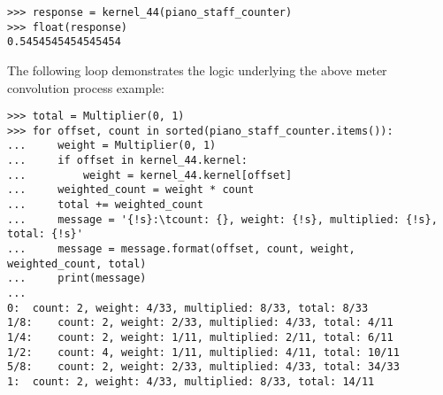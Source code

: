 \begin{abjadbookoutput}
\begin{singlespacing}
\vspace{-0.5\baselineskip}
\begin{verbatim}
>>> response = kernel_44(piano_staff_counter)
>>> float(response)
0.5454545454545454
\end{verbatim}
\end{singlespacing}
\end{abjadbookoutput}

\noindent The following loop demonstrates the logic underlying the above meter
convolution process example:

\begin{comment}
<abjad>
total = Multiplier(0, 1)
for offset, count in sorted(piano_staff_counter.items()):
    weight = Multiplier(0, 1)
    if offset in kernel_44.kernel:
        weight = kernel_44.kernel[offset]
    weighted_count = weight * count
    total += weighted_count
    message = '{!s}:\tcount: {}, weight: {!s}, multiplied: {!s}, total: {!s}'
    message = message.format(offset, count, weight, weighted_count, total)
    print(message)

</abjad>
\end{comment}

\begin{abjadbookoutput}
\begin{singlespacing}
\vspace{-0.5\baselineskip}
\begin{verbatim}
>>> total = Multiplier(0, 1)
>>> for offset, count in sorted(piano_staff_counter.items()):
...     weight = Multiplier(0, 1)
...     if offset in kernel_44.kernel:
...         weight = kernel_44.kernel[offset]
...     weighted_count = weight * count
...     total += weighted_count
...     message = '{!s}:\tcount: {}, weight: {!s}, multiplied: {!s}, total: {!s}'
...     message = message.format(offset, count, weight, weighted_count, total)
...     print(message)
...
0:	count: 2, weight: 4/33, multiplied: 8/33, total: 8/33
1/8:	count: 2, weight: 2/33, multiplied: 4/33, total: 4/11
1/4:	count: 2, weight: 1/11, multiplied: 2/11, total: 6/11
1/2:	count: 4, weight: 1/11, multiplied: 4/11, total: 10/11
5/8:	count: 2, weight: 2/33, multiplied: 4/33, total: 34/33
1:	count: 2, weight: 4/33, multiplied: 8/33, total: 14/11
\end{verbatim}
\end{singlespacing}
\end{abjadbookoutput}

